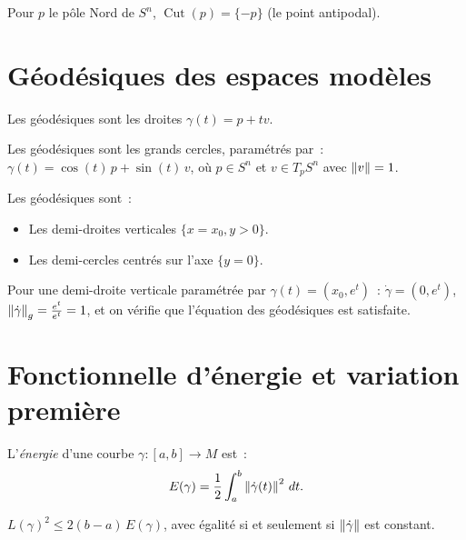\begin{exemple}
Pour $p$ le p\^ole Nord de $S^n$, $\operatorname{Cut}(p) = \{-p\}$ (le point antipodal).
\end{exemple}

\section{G\'eod\'esiques des espaces mod\`eles}

\begin{exemple}
Les g\'eod\'esiques sont les droites $\gamma(t) = p + tv$.
\end{exemple}

\begin{exemple}
Les g\'eod\'esiques sont les grands cercles, param\'etr\'es par~:
$\gamma(t) = \cos(t)\, p + \sin(t)\, v$,
o\`u $p \in S^n$ et $v \in T_pS^n$ avec $\left\| v \right\| = 1$.
\end{exemple}

\begin{exemple}
Les g\'eod\'esiques sont~:
\begin{itemize}
    \item Les demi-droites verticales $\{x = x_0, y > 0\}$.
    \item Les demi-cercles centr\'es sur l'axe $\{y = 0\}$.
\end{itemize}
Pour une demi-droite verticale param\'etr\'ee par $\gamma(t) = (x_0, e^t)$~:
$\dot\gamma = (0, e^t)$, $\left\| \dot\gamma \right\|_g = \frac{e^t}{e^t} = 1$, et on v\'erifie
que l'\'equation des g\'eod\'esiques est satisfaite.
\end{exemple}

\section{Fonctionnelle d'\'energie et variation premi\`ere}

\begin{definition}
L'\emph{\'energie} d'une courbe $\gamma : [a,b] \to M$ est~:
\[
    E(\gamma) = \frac{1}{2}\int_a^b \left\| \dot\gamma(t) \right\|^2\, dt.
\]
\end{definition}

\begin{proposition}
$L(\gamma)^2 \leq 2(b-a)\, E(\gamma)$, avec \'egalit\'e si et seulement si
$\left\| \dot\gamma \right\|$ est constant.
\end{proposition}

